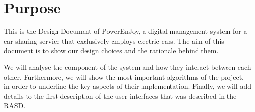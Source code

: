 \section{Purpose}
This is the Design Document of PowerEnJoy, a digital management system for a car-sharing service that exclusively employs electric cars.
The aim of this document is to show our design choices and the rationale behind them. 

We will analyse the component of the system and how they interact between each other.
Furthermore, we will show the most important algorithms of the project, in order to underline the key aspects of their implementation.
Finally, we will add details to the first description of the user interfaces that was described in the RASD.
